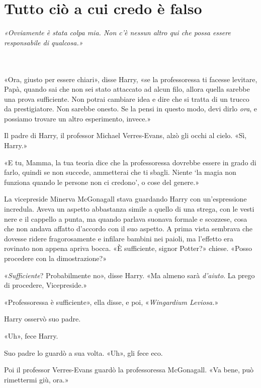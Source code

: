 
\chapter{Tutto ciò a cui credo è falso}
\label{capitolo:2}

\emph{«Ovviamente è stata colpa mia. Non c’è nessun altro qui che possa essere responsabile di qualcosa.»}

~\\
~\\

«Ora, giusto per essere chiari», disse Harry, «se la professoressa ti facesse levitare, Papà, quando sai che non sei stato attaccato ad alcun filo, allora quella sarebbe una prova sufficiente. Non potrai cambiare idea e dire che si tratta di un trucco da prestigiatore. Non sarebbe onesto. Se la pensi in questo modo, devi dirlo \emph{ora}, e possiamo trovare un altro esperimento, invece.»

Il padre di Harry, il professor Michael Verres-Evans, alzò gli occhi al cielo. «Sì, Harry.»

«E tu, Mamma, la tua teoria dice che la professoressa dovrebbe essere in grado di farlo, quindi se non succede, ammetterai che ti sbagli. Niente ‘la magia non funziona quando le persone non ci credono’, o cose del genere.»

La vicepreside Minerva McGonagall stava guardando Harry con un’espressione incredula. Aveva un aspetto abbastanza simile a quello di una strega, con le vesti nere e il cappello a punta, ma quando parlava suonava formale e scozzese, cosa che non andava affatto d’accordo con il suo aspetto. A prima vista sembrava che dovesse ridere fragorosamente e infilare bambini nei paioli, ma l’effetto era rovinato non appena apriva bocca. «È sufficiente, signor Potter?» chiese. «Posso procedere con la dimostrazione?»

«\emph{Sufficiente}? Probabilmente no», disse Harry. «Ma almeno sarà \emph{d’aiuto}. La prego di procedere, Vicepreside.»

«Professoressa è sufficiente», ella disse, e poi, «\emph{Wingardium Leviosa.}»

Harry osservò suo padre.

«Uh», fece Harry.

Suo padre lo guardò a sua volta. «Uh», gli fece eco.

Poi il professor Verres-Evans guardò la professoressa McGonagall. «Va bene, può rimettermi giù, ora.»


